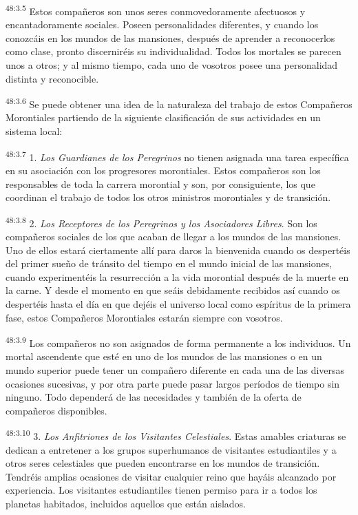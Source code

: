 \par
\textsuperscript{48:3.5} Estos compañeros son unos seres conmovedoramente afectuosos y encantadoramente sociales. Poseen personalidades diferentes, y cuando los conozcáis en los mundos de las mansiones, después de aprender a reconocerlos como clase, pronto discerniréis su individualidad. Todos los mortales se parecen unos a otros; y al mismo tiempo, cada uno de vosotros posee una personalidad distinta y reconocible.

\par
\textsuperscript{48:3.6} Se puede obtener una idea de la naturaleza del trabajo de estos Compañeros Morontiales partiendo de la siguiente clasificación de sus actividades en un sistema local:

\par
\textsuperscript{48:3.7} 1. \textit{Los Guardianes de los Peregrinos} no tienen asignada una tarea específica en su asociación con los progresores morontiales. Estos compañeros son los responsables de toda la carrera morontial y son, por consiguiente, los que coordinan el trabajo de todos los otros ministros morontiales y de transición.

\par
\textsuperscript{48:3.8} 2. \textit{Los Receptores de los Peregrinos y los Asociadores Libres}. Son los compañeros sociales de los que acaban de llegar a los mundos de las mansiones. Uno de ellos estará ciertamente allí para daros la bienvenida cuando os despertéis del primer sueño de tránsito del tiempo en el mundo inicial de las mansiones, cuando experimentéis la resurrección a la vida morontial después de la muerte en la carne. Y desde el momento en que seáis debidamente recibidos así cuando os despertéis hasta el día en que dejéis el universo local como espíritus de la primera fase, estos Compañeros Morontiales estarán siempre con vosotros.

\par
\textsuperscript{48:3.9} Los compañeros no son asignados de forma permanente a los individuos. Un mortal ascendente que esté en uno de los mundos de las mansiones o en un mundo superior puede tener un compañero diferente en cada una de las diversas ocasiones sucesivas, y por otra parte puede pasar largos períodos de tiempo sin ninguno. Todo dependerá de las necesidades y también de la oferta de compañeros disponibles.

\par
\textsuperscript{48:3.10} 3. \textit{Los Anfitriones de los Visitantes Celestiales}. Estas amables criaturas se dedican a entretener a los grupos superhumanos de visitantes estudiantiles y a otros seres celestiales que pueden encontrarse en los mundos de transición. Tendréis amplias ocasiones de visitar cualquier reino que hayáis alcanzado por experiencia. Los visitantes estudiantiles tienen permiso para ir a todos los planetas habitados, incluidos aquellos que están aislados.

